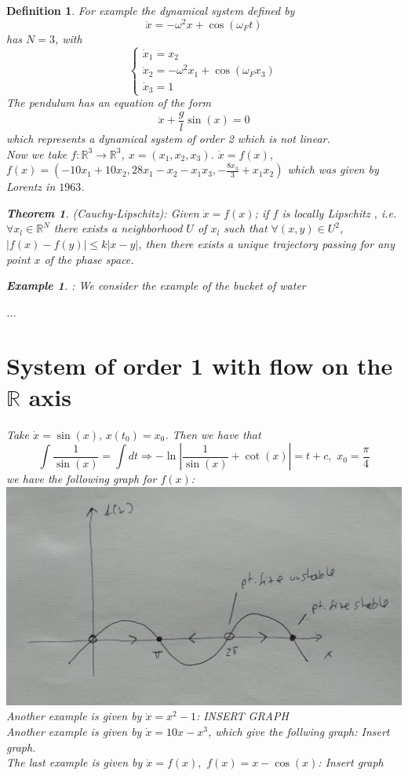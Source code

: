 \documentclass[10pt,a4paper]{book}
\newtheorem{thm}{Theorem}
\newtheorem{ex}{Example}
\newtheorem{definition}{Definition}
\begin{document}
\begin{definition}
For example the dynamical system defined by 
$$\ddot{x}=-\omega^2 x+\cos(\omega_F t)$$
has $N=3$, with 
$$\begin{cases}
\dot{x}_1=x_2\\
\dot{x}_2=-\omega^2 x_1+\cos(\omega_F x_3)\\
\dot{x}_3=1
\end{cases}$$
The pendulum has an equation of the form 
$$\ddot{x}+\frac{g}{l}\sin(x)=0$$ which represents a dynamical system of order 2 which is not linear.\\
Now we take $f:\mathbb{R}^3\to\mathbb{R}^3$, $x=(x_1,x_2,x_3)$. $\dot{x}=f(x)$, $f(x)=(-10x_1+10x_2,28x_1-x_2-x_1x_3,-\frac{8x_3}{3}+x_1x_2)$ which was given by Lorentz in $1963$.

\begin{thm}
 (Cauchy-Lipschitz):
Given $\dot{x}=f(x)$; if $f$ is locally Lipschitz , i.e.
$\forall x_l\in\mathbb{R}^N$ there exists a neighborhood $U$ of $x_l$ such that 
$\forall(x,y)\in U^2$, $|f(x)-f(y)|\leq k|x-y|$, then there exists a unique trajectory passing for any point $x$ of the phase space.

\end{thm}


\begin{ex}:
We consider the example of the bucket of water\end{ex}
...\\
\section{System of order 1 with flow on the $\mathbb{R}$ axis}
Take $\dot{x}=\sin(x),\, x(t_0)=x_0$. Then we have that 
$$\int \frac{1}{\sin(x)}=\int dt\Rightarrow -\ln|\frac{1}{\sin(x)}+\cot(x)|=t+c,\,\,x_0=\frac{\pi}{4}$$
we have the following graph for $f(x)$:\\
\includegraphics[scale=0.3]{fig2}\\
Another example is given by $\dot{x}=x^2-1$: 
INSERT GRAPH\\
Another example is given by $\dot{x}=10x-x^3$, which give the follwing graph:
Insert graph.\\
The last example is given by $\dot{x}=f(x),\,\, f(x)=x-\cos(x)$:
Insert graph\\



\end{definition}
\end{document}
